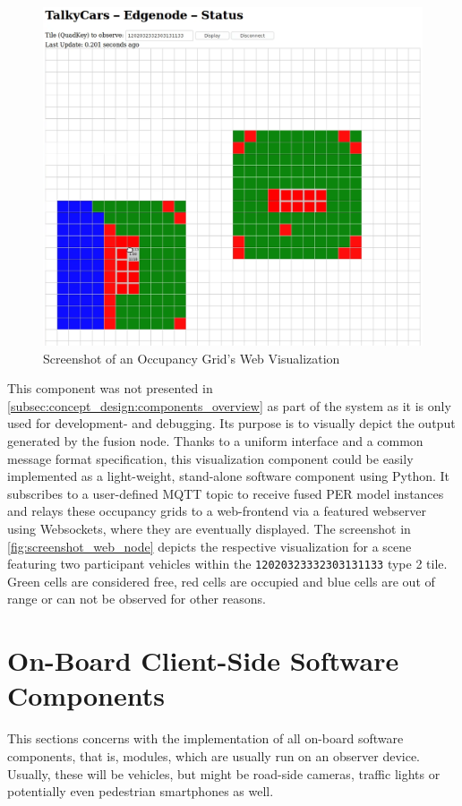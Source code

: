 \begin{figure}[h]
	\centering
	\includegraphics[width=0.8\linewidth]{98_images/screenshot_web_node}
	\caption{Screenshot of an Occupancy Grid's Web Visualization}
	\label{fig:screenshot_web_node}
\end{figure}

This component was not presented in \autoref{subsec:concept_design:components_overview} as part of the system as it is only used for development- and debugging. Its purpose is to visually depict the output generated by the fusion node. Thanks to a uniform interface and a common message format specification, this visualization component could be easily implemented as a light-weight, stand-alone software component using Python. It subscribes to a user-defined MQTT topic to receive fused PER model instances and relays these occupancy grids to a web-frontend via a featured webserver using Websockets, where they are eventually displayed. The screenshot in \autoref{fig:screenshot_web_node} depicts the respective visualization for a scene featuring two participant vehicles within the \texttt{12020323332303131133} type 2 tile. Green cells are considered free, red cells are occupied and blue cells are out of range or can not be observed for other reasons.

\section{On-Board Client-Side Software Components}
\label{sec:implementation:on_board_client_side_software_components}
This sections concerns with the implementation of all on-board software components, that is, modules, which are usually run on an observer device. Usually, these will be vehicles, but might be road-side cameras, traffic lights or potentially even pedestrian smartphones as well.

